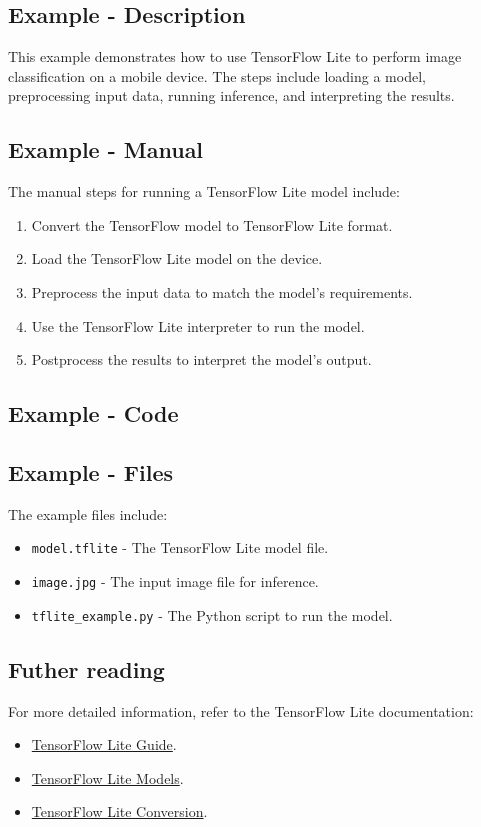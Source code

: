 \subsection{Example - Description}
This example demonstrates how to use TensorFlow Lite to perform image classification on a mobile device. The steps include loading a model, preprocessing input data, running inference, and interpreting the results.

\subsection{Example - Manual}
The manual steps for running a TensorFlow Lite model include:
\begin{enumerate}
	\item Convert the TensorFlow model to TensorFlow Lite format.
	\item Load the TensorFlow Lite model on the device.
	\item Preprocess the input data to match the model’s requirements.
	\item Use the TensorFlow Lite interpreter to run the model.
	\item Postprocess the results to interpret the model’s output.
\end{enumerate}

\subsection{Example - Code}

{
	\label{ExampleCode_TensorFlow.ino}
}



	
\subsection{Example - Files}
The example files include:
\begin{itemize}
	\item \texttt{model.tflite} - The TensorFlow Lite model file.
	\item \texttt{image.jpg} - The input image file for inference.
	\item \texttt{tflite\_example.py} - The Python script to run the model.
\end{itemize}

\subsection{Futher reading}
For more detailed information, refer to the TensorFlow Lite documentation:
\begin{itemize}
		\item \href{https://www.tensorflow.org/lite/guide}{TensorFlow Lite Guide}.
		\item \href{https://www.tensorflow.org/lite/models}{TensorFlow Lite Models}.
		\item \href{https://www.tensorflow.org/lite/convert}{TensorFlow Lite Conversion}.
	
\end{itemize}


